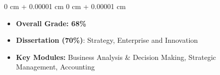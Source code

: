 \documentclass[10pt, letterpaper]{article}
\newenvironment{highlights}{
    \begin{itemize}[
        topsep=0.10 cm,
        parsep=0pt,
        partopsep=0pt,
        itemsep=0pt,
        leftmargin=0 cm + 10pt
    ]
}{
    \end{itemize}
}
\newenvironment{onecolentry}{
    \begin{adjustwidth}{
        0 cm + 0.00001 cm
    }{
        0 cm + 0.00001 cm
    }
}{
    \end{adjustwidth}
}
\begin{document}
\vspace{0.10 cm}

\begin{onecolentry}
    \begin{highlights}
        \item \textbf{Overall Grade: 68\%}
        \item \textbf{Dissertation (70\%)}: Strategy, Enterprise and Innovation
        \item \textbf{Key Modules:} Business Analysis \& Decision Making, Strategic Management, Accounting
    \end{highlights}
\end{onecolentry}

\end{document}
